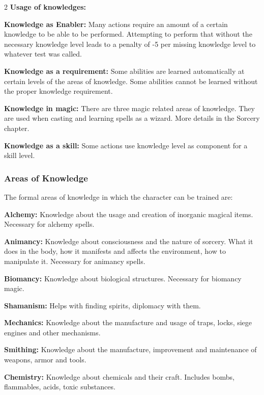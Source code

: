 \begin{multicols}{2}
\textbf{Usage of knowledges:}
\begin{proplist}
    \item \textbf{Knowledge as Enabler:} Many actions require an amount of a certain knowledge to be able to be performed. Attempting to perform that without the necessary knowledge level leads to a penalty of -5 per missing knowledge level to whatever test was called.
    \item \textbf{Knowledge as a requirement:} Some abilities are learned automatically at certain levels of the areas of knowledge. Some abilities cannot be learned without the proper knowledge requirement.
    \item \textbf{Knowledge in magic:} There are three magic related areas of knowledge. They are used when casting and learning spells as a wizard. More details in the Sorcery chapter.
    \item \textbf{Knowledge as a skill:} Some actions use knowledge level as component for a skill level. 
\end{proplist}

\subsubsection{Areas of Knowledge}

The formal areas of knowledge in which the character can be trained are:

\begin{proplist}
    \item \magic \textbf{Alchemy:} Knowledge about the usage and creation of inorganic magical items. Necessary for alchemy spells.
    \item \magic \textbf{Animancy:} Knowledge about consciousness and the nature of sorcery. What it does in the body, how it manifests and affects the environment, how to manipulate it. Necessary for animancy spells.
    \item \magic \textbf{Biomancy:} Knowledge about biological structures. Necessary for biomancy magic.
    \item \magic \textbf{Shamanism:} Helps with finding spirits, diplomacy with them.
    
    \item \textbf{Mechanics:} Knowledge about the manufacture and usage of traps, locks, siege engines and other mechanisms.
    \item \textbf{Smithing:} Knowledge about the manufacture, improvement and maintenance of weapons, armor and tools.
    \item \textbf{Chemistry:} Knowledge about chemicals and their craft. Includes bombs, flammables, acids, toxic substances.
 

\end{proplist}
\end{multicols}
